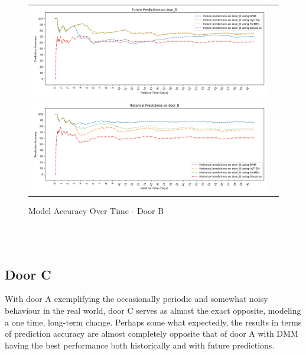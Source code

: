 \begin{center}
\begin{figure}[!Hp]
  \begin{tabular}{cc}
    {\includegraphics[width = 6in]{images/results/Future_Predictions_on_door_B.png}} \\
    {\includegraphics[width = 6in]{images/results/Historical_Predictions_on_door_B.png}} \\
  \end{tabular}
  \caption{Model Accuracy Over Time - Door B}
\end{figure}\\ \\
\end{center}


\subsection { Door C }

With door A exemplifying the occasionally periodic and somewhat noisy
behaviour in the real world, door C serves as almost the exact opposite,
modeling a one time, long-term change.
Perhaps some what expectedly, the results in terms of prediction accuracy are
almost completely opposite that of door A with DMM having the best
performance both historically and with future predictions. \\

